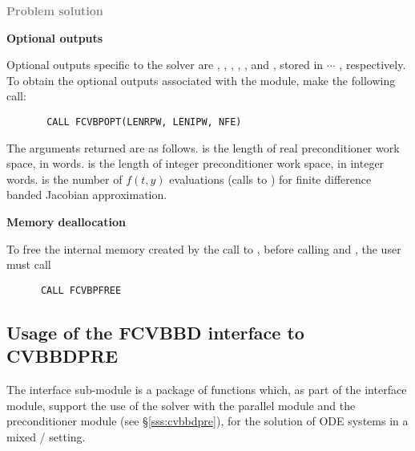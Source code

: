 \begin{Steps}
\item \textcolor{gray}{\bf Problem solution}
  
\item {\bf {\cvbbdpre} Optional outputs}
  
  Optional outputs specific to the {\spgmr} solver are , , , 
  , , and , stored in  $\cdots$ , 
  respectively.
  To obtain the optional outputs associated with the {\cvbandpre} module, make
  the following call:
\begin{verbatim}
       CALL FCVBPOPT(LENRPW, LENIPW, NFE)
\end{verbatim}
  The arguments returned are as follows.
   is the length of real preconditioner work space, in  words.
   is the length of integer preconditioner work space, in integer words.
   is the number of $f(t,y)$ evaluations (calls to ) for
  finite difference banded Jacobian approximation.
  
\item {\bf Memory deallocation}

  To free the internal memory created by the call to , before calling
   and , the user must call
\begin{verbatim}
      CALL FCVBPFREE
\end{verbatim}

\end{Steps}



\subsection{Usage of the FCVBBD interface to CVBBDPRE}

The {\fcvbbd} interface sub-module is a package of {\C} functions which,
as part of the {\fcvode} interface module, support the use of the
{\cvode} solver with the parallel {\nvecp} module and the {\cvbbdpre} 
preconditioner module (see \S\ref{sss:cvbbdpre}), for the solution of 
ODE systems in a mixed {\F}/{\C} setting.  

